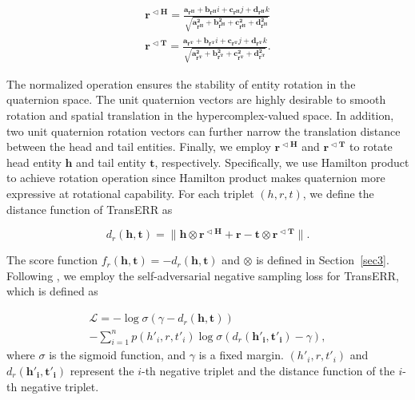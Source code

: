 \documentclass[11pt]{article}
\begin{document}
\begin{equation}
	\begin{aligned}
		\mathbf{r^{\vartriangleleft H}}=\frac{\mathbf{a_{r^H}}+\mathbf{b_{r^H}}i+\mathbf{c_{r^H}}j+\mathbf{d_{r^H}}k}{\sqrt{\mathbf{a_{r^H}^2}+\mathbf{b_{r^H}^2}+\mathbf{c_{r^H}^2}+\mathbf{d_{r^H}^2}}} \\
		\mathbf{r^{\vartriangleleft T}}=\frac{\mathbf{a_{r^T}}+\mathbf{b_{r^T}}i+\mathbf{c_{r^T}}j+\mathbf{d_{r^T}}k}{\sqrt{\mathbf{a_{r^T}^2}+\mathbf{b_{r^T}^2}+\mathbf{c_{r^T}^2}+\mathbf{d_{r^T}^2}}}.
	\end{aligned}
\end{equation}





The normalized operation ensures the stability of entity rotation in the quaternion space. The unit quaternion vectors are highly desirable to smooth rotation and spatial translation in the hypercomplex-valued space. In addition, two unit quaternion rotation vectors can further narrow the translation distance between the head and tail entities. Finally, we employ $\mathbf{r^{\vartriangleleft H}}$ and $\mathbf{r^{\vartriangleleft T}}$ to rotate head entity $\mathbf{h}$ and tail entity $\mathbf{t}$, respectively. Specifically, we use Hamilton product to achieve rotation operation since Hamilton product makes quaternion more expressive at rotational capability. For each triplet $(h, r, t)$, we define the distance function of TransERR as

\begin{equation}
	d_r(\mathbf{h},\mathbf{t}) = \parallel \mathbf{h} \otimes \mathbf{r^{\vartriangleleft H}} + \mathbf{r}- \mathbf{t} \otimes \mathbf{r^{\vartriangleleft T}}   \parallel.
\end{equation}

The score function $f_r(\mathbf{h},\mathbf{t}) = - d_r(\mathbf{h},\mathbf{t})$ and $\otimes$ is defined in Section~\ref{sec3}. Following \citet{31sun2019rotate}, we employ the self-adversarial negative sampling loss for TransERR, which is defined as


\begin{equation}
	\begin{aligned}
		\mathcal{L} = -\log \sigma (\gamma -d_r(\mathbf{h},\mathbf{t})) \\ - \sum_{i = 1}^{n}p(h'_i,r,t'_i)\log\sigma(d_r(\mathbf{h'_i},\mathbf{t'_i})-\gamma),
	\end{aligned}
\end{equation}
where $\sigma$ is the sigmoid function, and $\gamma$ is a fixed margin. $(h'_i,r,t'_i)$ and $d_r(\mathbf{h'_i},\mathbf{t'_i})$ represent the $i$-th negative triplet and the distance function of the $i$-th negative triplet. 
\end{document}
